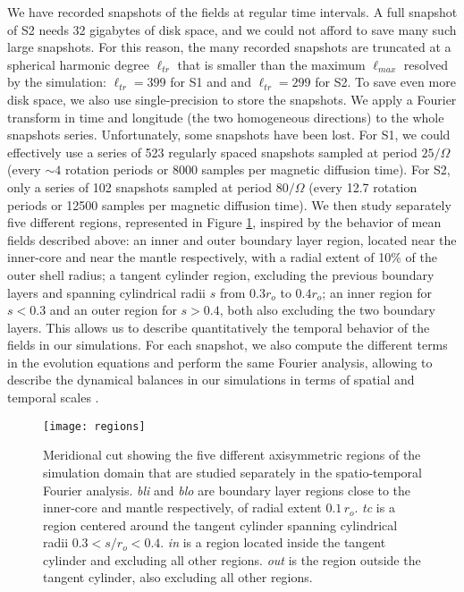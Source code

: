 \documentclass[12pt, a4paper]{article}
\begin{document}
We have recorded snapshots of the fields at regular time intervals.
A full snapshot of S2 needs 32 gigabytes of disk space, and we could not afford to save many such large snapshots.
For this reason, the many recorded snapshots are truncated at a spherical harmonic degree $\ell_{tr}$ that is smaller than the maximum $\ell_{max}$ resolved by the simulation: $\ell_{tr} = 399$ for S1 and and $\ell_{tr} = 299$ for S2.
To save even more disk space, we also use single-precision to store the snapshots.
We apply a Fourier transform in time and longitude (the two homogeneous directions) to the whole snapshots series.
Unfortunately, some snapshots have been lost.
For S1, we could effectively use a series of 523 regularly spaced snapshots sampled at period $25/\Omega$ (every $\sim 4$ rotation periods or 8000 samples per magnetic diffusion time).
For S2, only a series of 102 snapshots sampled at period $80/\Omega$ (every 12.7 rotation periods or 12500 samples per magnetic diffusion time).
We then study separately five different regions, represented in Figure \ref{fig:regions}, inspired by the behavior of mean fields described above:
an inner and outer boundary layer region, located near the inner-core and near the mantle respectively, with a radial extent of 10\% of the outer shell radius; a tangent cylinder region, excluding the previous boundary layers and spanning cylindrical radii $s$ from $0.3 r_o$ to $0.4 r_o$; an inner region for $s<0.3$ and an outer region for $s>0.4$, both also excluding the two boundary layers.
This allows us to describe quantitatively the temporal behavior of the fields in our simulations.
For each snapshot, we also compute the different terms in the evolution equations and perform the same Fourier analysis, allowing to describe the dynamical balances in our simulations in terms of spatial and temporal scales \citep{nataf2015}.

\begin{figure}
\begin{center}
\texttt{[image: regions]}
\caption{Meridional cut showing the five different axisymmetric regions of the simulation domain that are studied separately in the spatio-temporal Fourier analysis.
\textit{bli} and \textit{blo} are boundary layer regions close to the inner-core and mantle respectively, of radial extent $0.1 \, r_o$.
\textit{tc} is a region centered around the tangent cylinder spanning cylindrical radii $0.3<s/r_o<0.4$.
\textit{in} is a region located inside the tangent cylinder and excluding all other regions.
\textit{out} is the region outside the tangent cylinder, also excluding all other regions.
 }
\label{fig:regions}
\end{center}
\end{figure}
\end{document}

